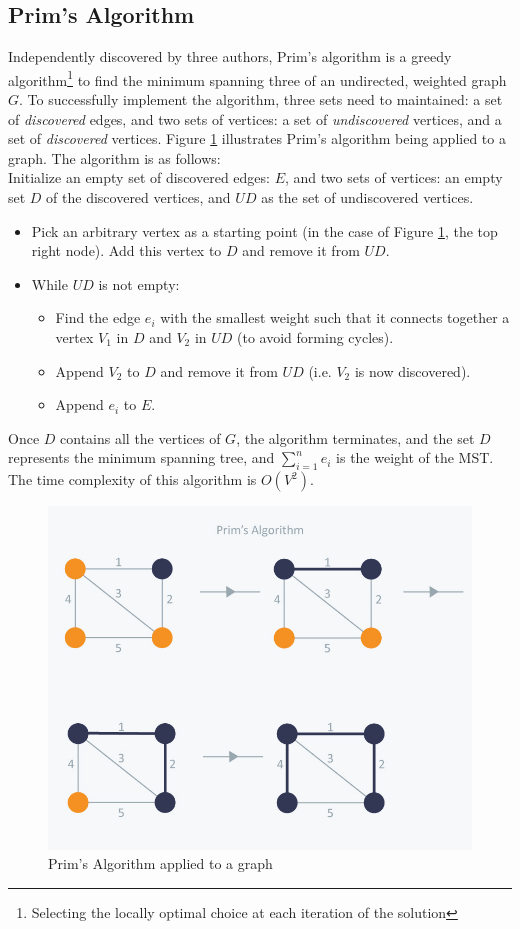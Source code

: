 \documentclass[paper=a4,fontsize=11pt]{report}	%
\begin{document}
\subsection{Prim's Algorithm}
Independently discovered by three authors,  Prim's algorithm \cite{prims}\cite{prims_og}\cite{prims3} is a greedy algorithm\footnote{Selecting the locally optimal choice at each iteration of the solution} to find the minimum spanning three of an undirected,  weighted graph $G$. To successfully implement the algorithm, three sets need to maintained: a set of \textit{discovered} edges, and two sets of vertices: a set of \textit{undiscovered} vertices, and a set of \textit{discovered} vertices.  Figure \ref{fig:prim} illustrates Prim's algorithm being applied to a graph. The algorithm is as follows:\\
Initialize an empty set of discovered edges: $E$, and two sets of vertices: an empty set $D$ of the discovered vertices, and $UD$ as the set of undiscovered vertices.
\begin{itemize}
\item Pick an arbitrary vertex as a starting point (in the case of Figure \ref{fig:prim}, the top right node). Add this vertex to $D$ and remove it from $UD$.
\item While $UD$ is not empty:
	\begin{itemize}
	\item Find the edge $e_i$ with the smallest weight such that it connects together a vertex $V_1$ in $D$ and $V_2$ in $UD$ (to avoid forming cycles).
	\item Append $V_2$ to $D$ and remove it from $UD$ (i.e. $V_2$ is now discovered).
	\item Append $e_i$ to $E$.
	\end{itemize}
\end{itemize}
Once $D$ contains all the vertices of $G$, the algorithm terminates, and the set $D$ represents the minimum spanning tree, and $\sum\limits_{i=1}^n e_i$ is the weight of the MST. The time complexity of this algorithm is $O(V^2)$.
\begin{figure}[H]
\centering\includegraphics[scale=0.5]{prims}
\caption{Prim's Algorithm applied to a graph \cite{prim-pic} }\label{fig:prim}
\end{figure}
\end{document}
